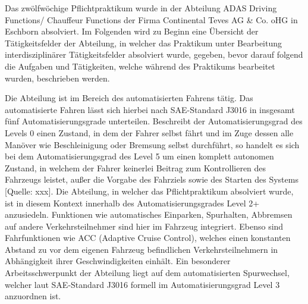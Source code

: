 Das zwölfwöchige Pflichtpraktikum wurde in der Abteilung ADAS Driving Functions/ Chauffeur Functions der Firma Continental Teves AG \& Co. oHG in Eschborn absolviert. Im Folgenden wird zu Beginn eine Übersicht der Tätigkeitsfelder der Abteilung, in welcher das Praktikum unter Bearbeitung interdisziplinärer Tätigkeitsfelder absolviert wurde, gegeben, bevor darauf folgend die Aufgaben und Tätigkeiten, welche während des Praktikums bearbeitet wurden, beschrieben werden. 

Die Abteilung ist im Bereich des automatisierten Fahrens tätig. Das automatisierte Fahren lässt sich hierbei nach SAE-Standard J3016 in insgesamt fünf Automatisierungsgrade unterteilen. Beschreibt der Automatisierungsgrad des Levels 0 einen Zustand, in dem der Fahrer selbst fährt und im Zuge dessen alle Manöver wie Beschleinigung oder Bremsung selbst durchführt, so handelt es sich bei dem Automatisierungsgrad des Level 5 um einen komplett autonomen Zustand, in welchem der Fahrer keinerlei Beitrag zum Kontrollieren des Fahrzeugs leistet, außer die Vorgabe des Fahrziels sowie des Starten des Systems [Quelle: xxx]. Die Abteilung, in welcher das Pflichtpraktikum absolviert wurde, ist in diesem Kontext innerhalb des Automatisierungsgrades Level 2+ anzusiedeln. Funktionen wie automatisches Einparken, Spurhalten, Abbremsen auf andere Verkehrsteilnehmer sind hier im Fahrzeug integriert. Ebenso sind Fahrfunktionen wie ACC (Adaptive Cruise Control), welches einen konstanten Abstand zu vor dem eigenen Fahrzeug befindlichen Verkehrsteilnehmern in Abhängigkeit ihrer Geschwindigkeiten einhält. Ein besonderer Arbeitsschwerpunkt der Abteilung liegt auf dem automatisierten Spurwechsel, welcher laut SAE-Standard J3016 formell im Automatisierungsgrad Level 3 anzuordnen ist.

